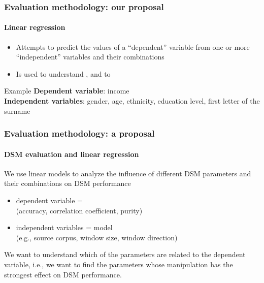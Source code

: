 \documentclass[t]{beamer} %
\begin{document}
\begin{frame}
  \frametitle{Evaluation methodology: our proposal}
  \framesubtitle{Linear regression}


  \begin{itemize}
  \item Attempts to predict the values of a ``dependent'' variable from one or more ``independent'' variables and their combinations
  \item Is used to understand , and to 
  \end{itemize}

  \begin{block}{Example}
    \textbf{Dependent variable}: income \\
    \textbf{Independent variables}: gender, age, ethnicity, education level, first letter of the surname
  \end{block}



  
\end{frame}

\begin{frame}
  \frametitle{Evaluation methodology: a proposal}
  \framesubtitle{DSM evaluation and linear regression}


  We use linear models to analyze the influence of different DSM parameters and their combinations on DSM performance
  \begin{itemize}
  \item dependent variable = \\
    (accuracy, correlation coefficient, purity)
  \item independent variables = model \\
    (e.g., source corpus, window size, window direction)
  \end{itemize}
  
  \begin{block}{}
    We want to understand which of the parameters are related to the dependent variable, i.e., we want to find the parameters whose manipulation has the strongest effect on DSM performance.
  \end{block}

\end{frame}
\end{document}
